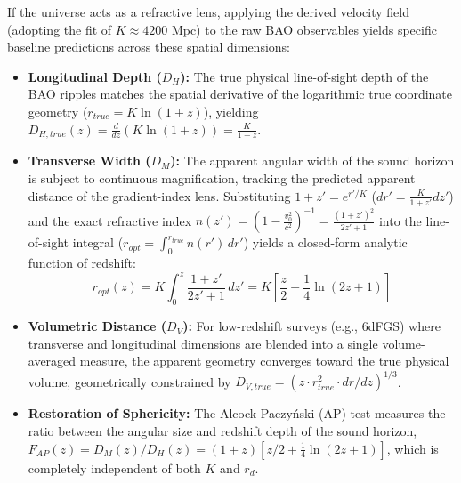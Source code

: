 \documentclass[11pt]{article}
\begin{document}
If the universe acts as a refractive lens, applying the derived velocity field (adopting the fit of $K \approx 4200$ Mpc) to the raw BAO observables yields specific baseline predictions across these spatial dimensions:
\begin{itemize}
    \item \textbf{Longitudinal Depth ($D_H$):} The true physical line-of-sight depth of the BAO ripples matches the spatial derivative of the logarithmic true coordinate geometry ($r_{true} = K \ln(1+z)$), yielding $D_{H,true}(z) = \frac{d}{dz}(K \ln(1+z)) = \frac{K}{1+z}$.
    \item \textbf{Transverse Width ($D_M$):} The apparent angular width of the sound horizon is subject to continuous magnification, tracking the predicted apparent distance of the gradient-index lens. Substituting $1 + z' = e^{r'/K}$ ($dr' = \frac{K}{1+z'}dz'$) and the exact refractive index $n(z') = \left(1 - \frac{v_0^2}{c^2}\right)^{-1} = \frac{(1+z')^2}{2z'+1}$ into the line-of-sight integral ($r_{opt} = \int_{0}^{r_{true}} n(r')\,dr'$) yields a closed-form analytic function of redshift:
    \begin{equation}
        r_{opt}(z) = K \int_0^z \frac{1+z'}{2z'+1}\,dz' = K \left[ \frac{z}{2} + \frac{1}{4}\ln(2z+1) \right]
    \end{equation}
    \item \textbf{Volumetric Distance ($D_V$):} For low-redshift surveys (e.g., 6dFGS) where transverse and longitudinal dimensions are blended into a single volume-averaged measure, the apparent geometry converges toward the true physical volume, geometrically constrained by $D_{V,true} = (z \cdot r_{true}^2 \cdot dr/dz)^{1/3}$.
    \item \textbf{Restoration of Sphericity:} The Alcock-Paczy\'nski (AP) test measures the ratio between the angular size and redshift depth of the sound horizon, $F_{AP}(z) = D_M(z)/D_H(z) = (1+z)[z/2 + \frac{1}{4}\ln(2z+1)]$, which is completely independent of both $K$ and $r_d$.
\end{itemize}
\end{document}
